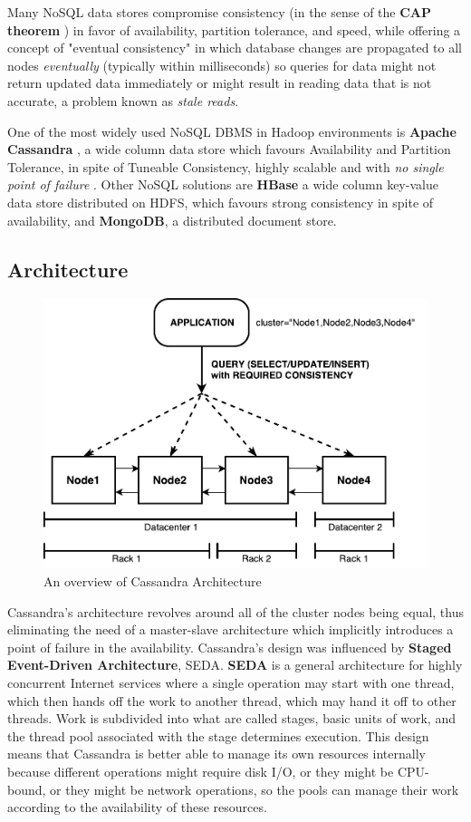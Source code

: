 Many NoSQL data stores compromise consistency (in the sense of the \textbf{CAP theorem} \cite{Gilbert:2002:BCF:564585.564601}) in favor of availability, partition tolerance, and speed, while offering a concept of "eventual consistency" in which database changes are propagated to all nodes \textit{eventually} (typically within milliseconds) so queries for data might not return updated data immediately or might result in reading data that is not accurate, a problem known as \textit{stale reads}.

One of the most widely used NoSQL DBMS in Hadoop environments is \textbf{Apache Cassandra} \cite{CassandraDefinitive}, a wide column data store which favours Availability and Partition Tolerance, in spite of Tuneable Consistency, highly scalable and with \textit{no single point of failure} \cite{Lakshman:2010:CDS:1773912.1773922}. Other NoSQL solutions are \textbf{HBase} a wide column key-value data store distributed on HDFS, which favours strong consistency in spite of availability, and \textbf{MongoDB}, a distributed document store.

\subsection{Architecture}

\begin{figure}[h]
    \centering
    \includegraphics[width=0.7\linewidth]{Figures/cassandra_arch}
    \caption{An overview of Cassandra Architecture}
    \label{fig:cassandraarch}
\end{figure}


Cassandra's architecture revolves around all of the cluster nodes being equal, thus eliminating the need of a master-slave architecture which implicitly introduces a point of failure in the availability. Cassandra’s design was influenced by \textbf{Staged Event-Driven Architecture}, SEDA. \textbf{SEDA} is a general architecture for highly concurrent Internet services \cite{Welsh:2001:SAW:502059.502057} where a single operation may start with one thread, which then hands off the work to another thread, which may hand it off to other threads. Work is subdivided into what are called stages, basic units of work, and the thread pool associated with the stage determines execution. This design means that Cassandra is better able to manage its own resources internally because different operations might require disk I/O, or they might be CPU-bound, or they might be network operations, so the pools can manage their work according to the availability of these resources.

